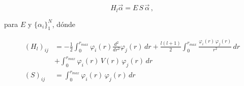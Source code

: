 \documentclass{beamer}
\begin{document}
\begin{frame}
    \begin{displaymath}\label{ec_auval}
    H_l \vec{\alpha} = E\,S\,\vec{\alpha}\,,
    \end{displaymath}

    \noindent 
    para $E$ y $\lbrace\alpha_i\rbrace_1^N$, d\'onde

    \begin{align}\label{elemento_matriz}
    (H_l)_{ij} &= -\frac{1}{2} \int_0^{r_{max}} \varphi_i(r) \frac{d^2}{dr^2}\varphi_j(r) \,dr \nonumber
               + \frac{l(l+1)}{2}\int_0^{r_{max}} \frac{\varphi_i(r) \,\varphi_j(r)}{r^2} \,dr \\
               & + \int_0^{r_{max}} \varphi_i(r)\,V(r)\,\varphi_j(r)\, dr \\
    (S)_{ij} &= \int_0^{r_{max}} \varphi_i(r)\,\varphi_j(r)\,dr \label{solapamiento}
    \end{align}
\end{frame}
\end{document}
